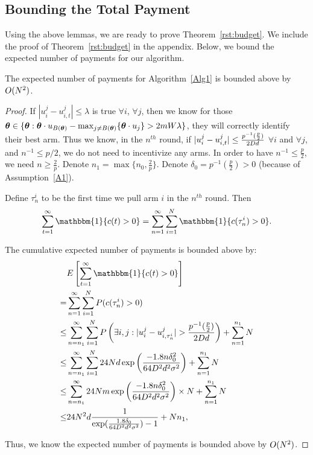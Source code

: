 \subsection{Bounding the Total Payment}

Using the above lemmas, we are ready to prove Theorem~\ref{rst:budget}. We include the proof of Theorem~\ref{rst:budget} in the appendix. Below, we bound the expected number of payments for our algorithm.
\begin{lemma}
The expected number of payments for Algorithm~\ref{Alg1} is bounded above by $O(N^2)$.
\label{lemma:numP}
\end{lemma}
\begin{proof}
If $|u_{i}^{j}-u_{i,t}^{j}|\leq \lambda$ is true $\forall i$, $\forall j$, then we know for those $\bm{\theta}\in \{\bm{\theta}:\bm{\theta}\cdot u_{B(\bm{\theta})}-\max_{j\neq B(\bm{\theta})}\{\bm{\theta} \cdot u_{j}\}> 2mW\lambda\}$, they will correctly identify their best arm. Thus we know, in the $n^{th}$ round, if $|u_{i}^{j}-u_{i,t}^{j}|\leq \frac{p^{-1}(\frac{p}{2})}{2 D d}$ $\forall i$ and $\forall j$, and $n^{-1}\leq p/2$, we do not need to incentivize any arms. In order to have $n^{-1}\leq \frac{p}{2}$, we need $n\geq \frac{2}{p}$. Denote $n_1=\max\{n_{0}, \frac{2}{p}\}$. Denote $\delta_{0}=p^{-1}(\frac{p}{2})>0$ (because of Assumption~\ref{A1}).

Define $\tau_{n}^{i}$ to be the first time we pull arm $i$ in the $n^{th}$ round. Then
\begin{align}
\sum_{t=1}^{\infty}\mathbbm{1}\{c(t)>0\} =\sum_{n=1}^{\infty}\sum_{i=1}^{N}\mathbbm{1}\{c(\tau_{n}^{i})>0\}. \nonumber
\end{align}

The cumulative expected number of payments is bounded above by:
\begin{align}
&E\left[\sum_{t=1}^{\infty}\mathbbm{1}\{c(t)>0\}\right] \nonumber \\
=&\sum_{n=1}^{\infty}\sum_{i=1}^{N}P(c(\tau_{n}^{i})>0) \nonumber \\
\leq &\sum_{n=n_{1}}^{\infty}\sum_{i=1}^{N}P\left(\exists i,j:|u_{i}^{j}-u_{i,\tau_{n}^{i}}^{j}|>\frac{p^{-1}(\frac{p}{2})}{2 \Diam d}\right)+\sum_{n=1}^{n_1}\ARMNUM \nonumber \\
\leq &\sum_{n=n_{1}}^{\infty}\sum_{i=1}^{N}24 \ARMNUM d
       \exp\left(\frac{-1.8 n\delta_{0}^2}{64 \Diam^2 d^2\sigma^2}\right) +\sum_{n=1}^{n_1}\ARMNUM \nonumber \\
\leq & \sum_{n=n_{1}}^{\infty}24Nm \exp\left(\frac{-1.8 n\delta_{0}^2}{64\Diam^2 d^2\sigma^2}\right)\times \ARMNUM+\sum_{n=1}^{n_1}\ARMNUM \nonumber  \\
\leq&24 \ARMNUM^2 d \frac{1}{\exp(\frac{1.8\delta_{0}}{64\Diam^2 d^2\sigma^2})-1} + Nn_1, \nonumber
\end{align}

Thus, we know the expected number of payments is bounded above by $O(N^2)$.

\end{proof}

